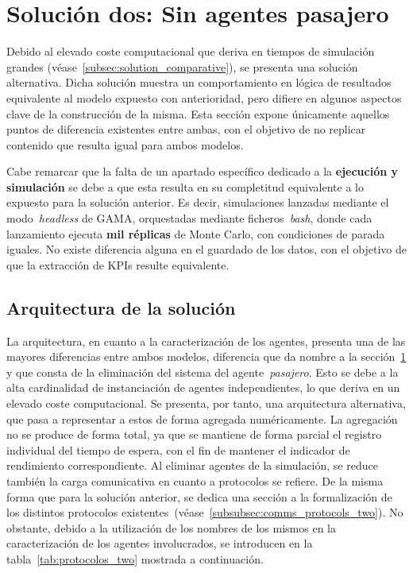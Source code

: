 \section{Solución dos: Sin agentes pasajero}\label{sec:second_sol}
Debido al elevado coste computacional que deriva en tiempos de simulación grandes (véase~\ref{subsec:solution_comparative}),
se presenta una solución alternativa. Dicha solución muestra un comportamiento en lógica de resultados equivalente al modelo expuesto 
con anterioridad, pero difiere en algunos aspectos clave de la construcción de la misma. Esta sección expone únicamente aquellos puntos
de diferencia existentes entre ambas, con el objetivo de no replicar contenido que resulta igual para ambos modelos.

Cabe remarcar que la falta de un apartado específico dedicado a la \textbf{ejecución y simulación} se debe a que
esta resulta en su completitud equivalente a lo expuesto para la
solución anterior. Es decir, simulaciones lanzadas mediante el modo~\textit{headless} de GAMA, orquestadas mediante ficheros~\textit{bash},
donde cada lanzamiento ejecuta \textbf{mil réplicas} de Monte Carlo, con condiciones de parada iguales. No existe diferencia alguna
en el guardado de los datos, con el objetivo de que la extracción de KPIs resulte equivalente.

\subsection{Arquitectura de la solución}\label{subsec:arch_two}
La arquitectura, en cuanto a la caracterización de los agentes, presenta una de las mayores diferencias entre ambos modelos,
diferencia que da nombre a la sección~\ref{sec:second_sol} y que consta de la eliminación del sistema del agente~\textit{pasajero}. Esto se debe a la 
alta cardinalidad de instanciación de agentes independientes, lo que deriva en un elevado coste computacional. Se presenta, por tanto,
una arquitectura alternativa, que pasa a representar a estos de forma agregada numéricamente. La agregación no se produce de forma total,
ya que se mantiene de forma parcial el registro individual del tiempo de espera, con el fin de mantener el indicador de rendimiento
correspondiente. Al eliminar agentes de la simulación, se reduce también 
la carga comunicativa en cuanto a protocolos se refiere. De la misma forma que para la solución anterior, se dedica una sección a la 
formalización de los distintos protocolos existentes~(véase~\ref{subsubsec:comms_protocols_two}). No obstante, debido a la utilización
de los nombres de los mismos en la caracterización de los agentes involucrados, se introducen en la tabla~\ref{tab:protocolos_two}
mostrada a continuación.

